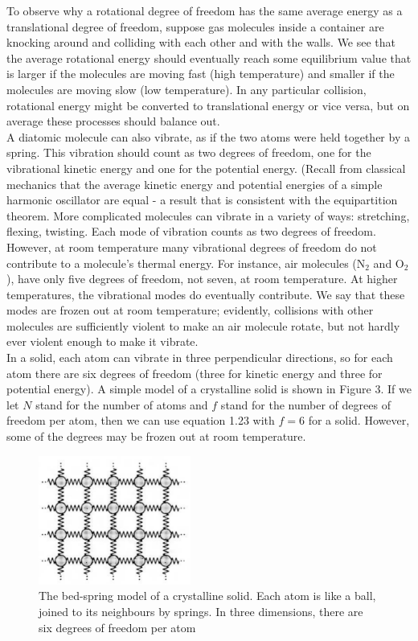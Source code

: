\documentclass[11pt]{exam}
\begin{document}
\hspace*{10mm}To observe why a rotational degree of freedom has the same average energy as a translational degree of freedom, suppose gas molecules inside a container are knocking around and colliding with each other and with the walls. We see that the average rotational energy should eventually reach some equilibrium value that is larger if the molecules are moving fast (high temperature) and smaller if the molecules are moving slow (low temperature). In any particular collision, rotational energy might be converted to translational energy or vice versa, but on average these processes should balance out. \\
\hspace*{10mm}A diatomic molecule can also vibrate, as if the two atoms were held together by a spring. This vibration should count as two degrees of freedom, one for the vibrational kinetic energy and one for the potential energy. (Recall from classical mechanics that the average kinetic energy and potential energies of a simple harmonic oscillator are equal - a result that is consistent with the equipartition theorem. More complicated molecules can vibrate in a variety of ways: stretching, flexing, twisting. Each mode of vibration counts as two degrees of freedom. \\
\hspace*{10mm}However, at room temperature many vibrational degrees of freedom do not contribute to a molecule's thermal energy. For instance, air molecules (N$_2$ and O$_2$), have only five degrees of freedom, not seven, at room temperature. At higher temperatures, the vibrational modes do eventually contribute. We say that these modes are frozen out at room temperature; evidently, collisions with other molecules are sufficiently violent to make an air molecule rotate, but not hardly ever violent enough to make it vibrate. \\
\hspace*{10mm}In a solid, each atom can vibrate in three perpendicular directions, so for each atom there are six degrees of freedom (three for kinetic energy and three for potential energy). A simple model of a crystalline solid is shown in Figure 3. If we let $N$ stand for the number of atoms and $f$ stand for the number of degrees of freedom per atom, then we can use equation 1.23 with $f=6$ for a solid. However, some of the degrees may be frozen out at room temperature. 
\begin{figure}[htp]
    \centering
    \includegraphics[width=5cm]{figure3.png}
    \caption{The bed-spring model of a crystalline solid. Each atom is like a ball, joined to its neighbours by springs. In three dimensions, there are six degrees of freedom per atom}
\label{fig:crystalline_solid}
\end{figure}\\
\end{document}

